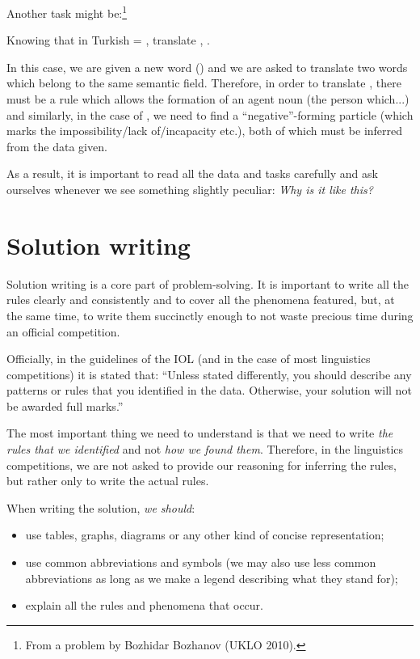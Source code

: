Another task might be:\footnote{From a problem by Bozhidar Bozhanov (UKLO 2010).}
\begin{assgts}[resume, label=Example task 1.3]
    \item Knowing that in Turkish  = , translate , .
\end{assgts}

In this case, we are given a new word () and we are asked to translate two words which belong to the same semantic field. Therefore, in order to translate , there must be a rule which allows the formation of an agent noun (the person which...) and similarly, in the case of , we need to find a “negative”-forming particle (which marks the impossibility\slash lack of\slash incapacity etc.), both of which must be inferred from the data given.

As a result, it is important to read all the data and tasks carefully and ask ourselves whenever we see something slightly peculiar: \textit{Why is it like this?}

\section{Solution writing}\largerpage[2]
Solution writing is a core part of problem-solving. It is important to write all the rules clearly and consistently and to cover all the phenomena featured, but, at the same time, to write them succinctly enough to not waste precious time during an official competition.

Officially, in the guidelines of the IOL (and in the case of most linguistics competitions) it is stated that: “Unless stated differently, you should describe any patterns or rules that you identified in the data. Otherwise, your solution will not be awarded full marks.”

The most important thing we need to understand is that we need to write \textit{the rules that we identified} and not \textit{how we found them}. Therefore, in the linguistics competitions, we are not asked to provide our reasoning for inferring the rules, but rather only to write the actual rules.

When writing the solution, \textit{we should}:
\begin{itemize}
    \item use tables, graphs, diagrams or any other kind of concise representation;
    \item use common abbreviations and symbols (we may also use less common abbreviations as long as we make a legend describing what they stand for);
    \item explain all the rules and phenomena that occur.
\end{itemize}


